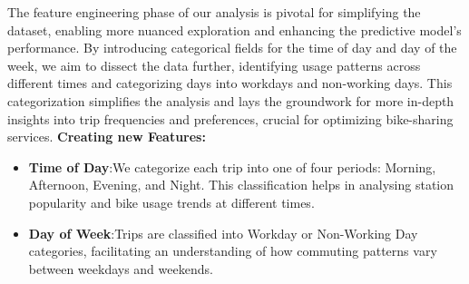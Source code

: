         The feature engineering phase of our analysis is pivotal for simplifying the dataset, enabling more nuanced exploration and enhancing the predictive model's performance.
        By introducing categorical fields for the time of day and day of the week, we aim to dissect the data further, identifying usage patterns across different times and categorizing days into workdays and non-working days.
        This categorization simplifies the analysis and lays the groundwork for more in-depth insights into trip frequencies and preferences, crucial for optimizing bike-sharing services.\newline
        \textbf{Creating new Features:}\newline
        \begin{itemize}
            \item \textbf{Time of Day}:\newline We categorize each trip into one of four periods: Morning, Afternoon, Evening, and Night. This classification helps in analysing station popularity and bike usage trends at different times.
            \item\textbf{Day of Week}:\newline Trips are classified into Workday or Non-Working Day categories, facilitating an understanding of how commuting patterns vary between weekdays and weekends.
        \end{itemize}

